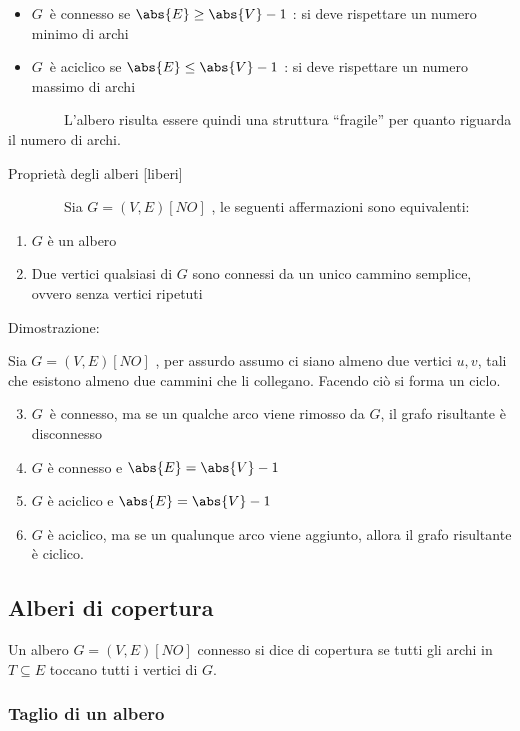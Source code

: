 \documentclass[tikz]{article}
\providecommand{\tightlist}{%
  \setlength{\itemsep}{0pt}\setlength{\parskip}{0pt}}
\begin{document}
{{\begin{itemize}
\tightlist
\item
  $G${~è connesso se $\abs{E} \geq \abs{V} - 1$ : si deve rispettare un numero minimo di archi}
\item
  $G${~è aciclico se $\abs{E} \leq \abs{V} - 1$ : si deve rispettare un numero massimo di archi}
\end{itemize}

{~~~~~~~~L'albero risulta essere quindi una struttura ``fragile'' per
quanto riguarda il numero di archi.}

{Proprietà degli alberi {[}liberi{]}}

{~~~~~~~~Sia }$G=(V,E) [NO]$ {, le seguenti affermazioni sono equivalenti:}

\begin{enumerate}
\tightlist
\item
  {$G$ è un albero}
\item
  {Due vertici qualsiasi di $G$ sono connessi da un unico cammino semplice, ovvero senza vertici ripetuti}
\end{enumerate}

{Dimostrazione:~~~~~~~~}

{Sia }$G=(V,E) [NO]$ {, per assurdo assumo ci siano almeno due vertici $u,v$, tali che esistono almeno due cammini che li collegano. Facendo ciò si forma un ciclo.}

\begin{enumerate}
\setcounter{enumi}{2}
\tightlist
\item
  $G${~è connesso, ma se un qualche
  arco viene rimosso da }$G${, il
  grafo risultante è disconnesso}
\item
  {$G$ è connesso e $\abs{E}=\abs{V}-1$}
\item
  {$G$ è aciclico e $\abs{E}=\abs{V}-1$}
\item
  {$G$ è aciclico, ma se un qualunque arco viene aggiunto, allora il grafo risultante è ciclico.}
\end{enumerate}

\subsection{Alberi di copertura}

{Un albero $G=(V,E) [NO]$ connesso si dice di copertura se tutti gli archi in $T \subseteq E$ toccano tutti i vertici di $G$.}

\subsubsection{Taglio di un albero}

}}
\end{document}
